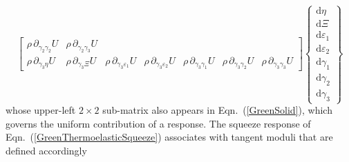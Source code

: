 \begin{equation}
\begin{bmatrix}
\rho \, \partial_{\gamma_2\gamma_2} U &
\rho \, \partial_{\gamma_2\gamma_3} U \\
\rho \, \partial_{\gamma_3\eta} U & 
\rho \, \partial_{\gamma_3\Xi} U & 
\rho \, \partial_{\gamma_3\varepsilon_1} U & 
\rho \, \partial_{\gamma_3\varepsilon_2} U &
\rho \, \partial_{\gamma_3\gamma_1} U  &
\rho \, \partial_{\gamma_3\gamma_2} U &
\rho \, \partial_{\gamma_3\gamma_3} U
\end{bmatrix}
\left\{ \begin{matrix}
\mathrm{d}\eta \\ \mathrm{d} \Xi \\
\mathrm{d} \varepsilon_1 \\ \mathrm{d} \varepsilon_2 \\
\mathrm{d} \gamma_1 \\ \mathrm{d} \gamma_2 \\ \mathrm{d} \gamma_3
\end{matrix} \right\}
\label{energies3D}
\end{equation}
\normalsize
whose upper-left $2\times 2$ sub-matrix also appears in Eqn.~(\ref{GreenSolid}), which governs the uniform contribution of a response.  The squeeze response of Eqn.~(\ref{GreenThermoelasticSqueeze}) associates with tangent moduli that are defined accordingly
